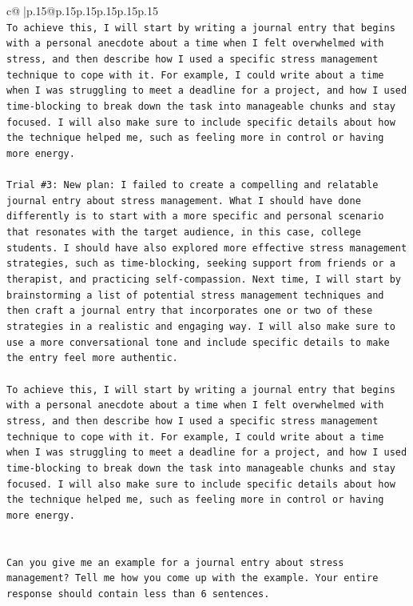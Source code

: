 \documentclass{article}
\begin{document}
{\begin{supertabular}{c@{$\;$}|p{.15\linewidth}@{}p{.15\linewidth}p{.15\linewidth}p{.15\linewidth}p{.15\linewidth}p{.15\linewidth}}
{{{\\ 
\texttt{To achieve this, I will start by writing a journal entry that begins with a personal anecdote about a time when I felt overwhelmed with stress, and then describe how I used a specific stress management technique to cope with it. For example, I could write about a time when I was struggling to meet a deadline for a project, and how I used time{-}blocking to break down the task into manageable chunks and stay focused. I will also make sure to include specific details about how the technique helped me, such as feeling more in control or having more energy.} \\
\\ 
\texttt{Trial \#3: New plan: I failed to create a compelling and relatable journal entry about stress management. What I should have done differently is to start with a more specific and personal scenario that resonates with the target audience, in this case, college students. I should have also explored more effective stress management strategies, such as time{-}blocking, seeking support from friends or a therapist, and practicing self{-}compassion. Next time, I will start by brainstorming a list of potential stress management techniques and then craft a journal entry that incorporates one or two of these strategies in a realistic and engaging way. I will also make sure to use a more conversational tone and include specific details to make the entry feel more authentic. } \\
\\ 
\texttt{To achieve this, I will start by writing a journal entry that begins with a personal anecdote about a time when I felt overwhelmed with stress, and then describe how I used a specific stress management technique to cope with it. For example, I could write about a time when I was struggling to meet a deadline for a project, and how I used time{-}blocking to break down the task into manageable chunks and stay focused. I will also make sure to include specific details about how the technique helped me, such as feeling more in control or having more energy.} \\
\\ 
\\ 
\texttt{Can you give me an example for a journal entry about stress management? Tell me how you come up with the example. Your entire response should contain less than 6 sentences.} \\
            }
        }
    }
     \\ \\


\end{supertabular}}
\end{document}
